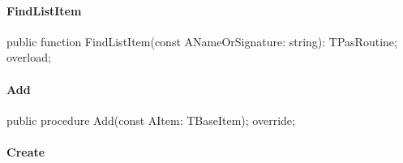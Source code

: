 \documentclass{report}
\newif\ifpdf
\begin{document}
\paragraph*{FindListItem}\hspace*{\fill}

\label{PasDoc_Items.TPasRoutines-FindListItem}
\begin{list}{}{
\setlength{\itemindent}{0cm}
\setlength{\listparindent}{0cm}
\setlength{\leftmargin}{\evensidemargin}
\addtolength{\leftmargin}{\tmplength}
\settowidth{\labelsep}{X}
\addtolength{\leftmargin}{\labelsep}
\setlength{\labelwidth}{\tmplength}
}
\item[\textbf{Declaration}\hfill]
\ifpdf
\begin{flushleft}
\fi
\begin{ttfamily}
public function FindListItem(const ANameOrSignature: string): TPasRoutine; overload;\end{ttfamily}

\ifpdf
\end{flushleft}
\fi

\end{list}
\paragraph*{Add}\hspace*{\fill}

\label{PasDoc_Items.TPasRoutines-Add}
\begin{list}{}{
\setlength{\itemindent}{0cm}
\setlength{\listparindent}{0cm}
\setlength{\leftmargin}{\evensidemargin}
\addtolength{\leftmargin}{\tmplength}
\settowidth{\labelsep}{X}
\addtolength{\leftmargin}{\labelsep}
\setlength{\labelwidth}{\tmplength}
}
\item[\textbf{Declaration}\hfill]
\ifpdf
\begin{flushleft}
\fi
\begin{ttfamily}
public procedure Add(const AItem: TBaseItem); override;\end{ttfamily}

\ifpdf
\end{flushleft}
\fi

\end{list}
\paragraph*{Create}\hspace*{\fill}
\end{document}
